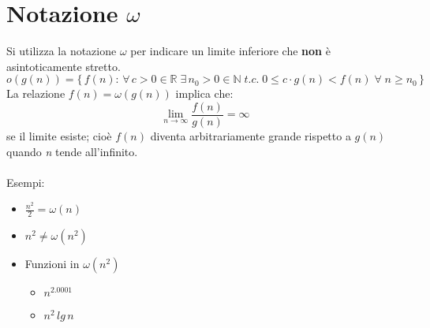 \documentclass[10pt, a4paper]{report}
\begin{document}
\section{Notazione $\omega$}
Si utilizza la notazione $\omega$ per indicare un limite inferiore che \textbf{non} è asintoticamente stretto.
\begin{equation*}
o(g(n)) = \{\,f(n) :\,\forall \,c > 0 \in\mathbb{R}\;\exists \,n_0 > 0 \in\mathbb{N}\;t.c.\;0\leq c\cdot g(n) < f(n)\;\forall\;n\geq n_0\,\}
\end{equation*}
La relazione $f(n) = \omega(g(n))$ implica che:
\begin{equation*}
\lim_{n\to \infty} \frac{f(n)}{g(n)} = \infty
\end{equation*}
se il limite esiste; cioè $f(n)$ diventa arbitrariamente grande rispetto a $g(n)$ quando \textit{n} tende all'infinito.\\\\
Esempi:
\begin{itemize}
\item$\frac{n^2}{2} = \omega(n)$
\item$n^2 \neq \omega(n^2)$
\item Funzioni in $\omega(n^2)$
\begin{itemize}
\item$n^{2.0001}$
\item$n^2\,lg\,n$
\end{itemize}
\end{itemize}
\end{document}

